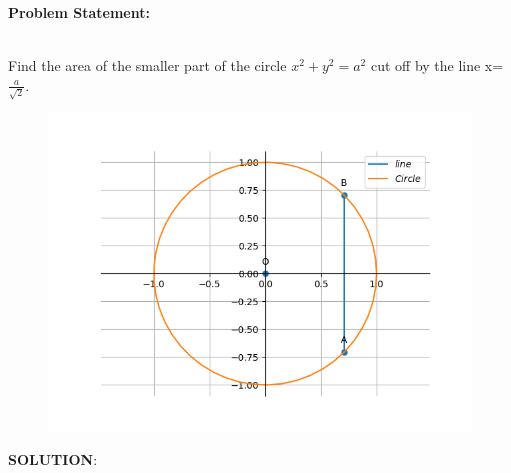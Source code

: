 \documentclass[10pt,a4paper]{report}
\begin{document}
\begin{multicols}{2}

\raggedright \textbf{Problem Statement:}\vspace{2mm}
\raggedright \\
\fi
	Find the area of the smaller part of the circle $x^2+y^2=a^2 $ cut off by the line x=$\frac{a}{\sqrt{2}}$.
	\\
	\solution
	\begin{figure}[!h]
		\centering
 \includegraphics[width=\columnwidth]{chapters/12/8/1/7/figs/conic.png}
		\caption{}
		\label{fig:12/8/1/7}
  	\end{figure}
	\iffalse
\vspace{5mm}
\raggedright \textbf{SOLUTION}:\vspace{2mm}\\


\end{multicols}
\end{document}

